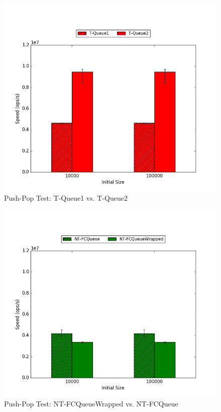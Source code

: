 \begin{figure}[H]
    \centering
	\begin{minipage}{0.45\textwidth}
	\includegraphics[width=\textwidth]{fcqueues/stoQ:PushPop.png}
	\end{minipage}
	\begin{minipage}{0.45\textwidth}
		
	\end{minipage}
    \caption{Push-Pop Test: T-Queue1 vs. T-Queue2}
    \label{fig:stoqs_pushpop}
\end{figure}

\begin{figure}[H]
    \centering
	\begin{minipage}{0.5\textwidth}\includegraphics[width=\textwidth]{fcqueues/ntQ:PushPop.png}
	\end{minipage}
	\begin{minipage}{0.45\textwidth}
    
	\end{minipage}
    \caption{Push-Pop Test: NT-FCQueueWrapped vs. NT-FCQueue}
    \label{fig:ntqs_pushpop}
\end{figure}

